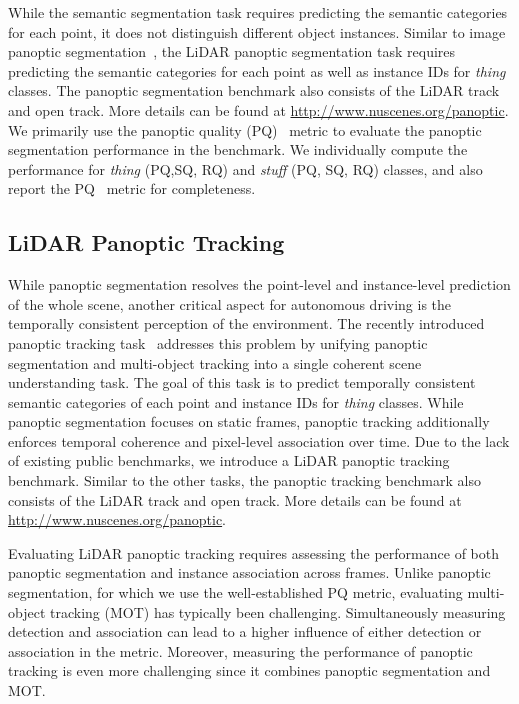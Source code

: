 \documentclass[letterpaper, 10 pt, journal, twoside]{IEEEtran}
\begin{document}
While the semantic segmentation task requires predicting the semantic categories for each point, it does not distinguish different object instances. Similar to image panoptic segmentation~\cite{kirillov2019panoptic}, the LiDAR panoptic segmentation task requires predicting the semantic categories for each point as well as instance IDs for \emph{thing} classes. The panoptic segmentation benchmark also consists of the LiDAR track and open track. More details can be found at \url{http://www.nuscenes.org/panoptic}. We primarily use the panoptic quality (PQ)~\cite{kirillov2019panoptic} metric to evaluate the panoptic segmentation performance in the benchmark. We individually compute the performance for \emph{thing} (PQ,SQ, RQ) and \emph{stuff} (PQ, SQ, RQ) classes, and also report the PQ~\cite{porzi2019seamless} metric for completeness. 

\subsection{LiDAR Panoptic Tracking}
\label{sec:panoptic_tracking}
While panoptic segmentation resolves the point-level and instance-level prediction of the whole scene, another critical aspect for autonomous driving is the temporally consistent perception of the environment. The recently introduced panoptic tracking task~\cite{hurtado2020mopt} addresses this problem by unifying panoptic segmentation and multi-object tracking into a single coherent scene understanding task. The goal of this task is to predict temporally consistent semantic categories of each point and instance IDs for \emph{thing} classes. While panoptic segmentation focuses on static frames, panoptic tracking additionally enforces temporal coherence and pixel-level association over time. Due to the lack of existing public benchmarks, we introduce a LiDAR panoptic tracking benchmark. Similar to the other tasks, the panoptic tracking benchmark also consists of the LiDAR track and open track. More details can be found at \url{http://www.nuscenes.org/panoptic}.

Evaluating LiDAR panoptic tracking requires assessing the performance of both panoptic segmentation and instance association across frames. Unlike panoptic segmentation, for which we use the well-established PQ metric, evaluating multi-object tracking (MOT) has typically been challenging. Simultaneously measuring detection and association can lead to a higher influence of either detection or association in the metric. Moreover, measuring the performance of panoptic tracking is even more challenging since it combines panoptic segmentation and MOT.
\end{document}
